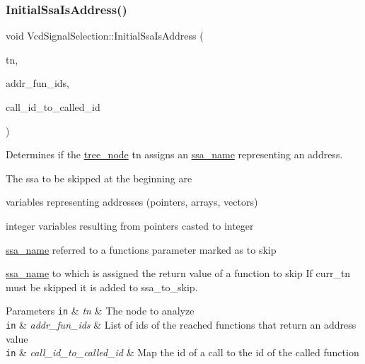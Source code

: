 \subsubsection{\texorpdfstring{Initial\+Ssa\+Is\+Address()}{InitialSsaIsAddress()}}
{\footnotesize\ttfamily void Vcd\+Signal\+Selection\+::\+Initial\+Ssa\+Is\+Address (\begin{DoxyParamCaption}\item[{const \hyperlink{tree__node_8hpp_a3cf5d02292c940f3892425a5b5fdec3c}{tree\+\_\+node\+Const\+Ref} \&}]{tn,  }\item[{const \hyperlink{classCustomUnorderedSet}{Custom\+Unordered\+Set}$<$ unsigned int $>$ \&}]{addr\+\_\+fun\+\_\+ids,  }\item[{const \hyperlink{custom__map_8hpp_ad1ed68f2ff093683ab1a33522b144adc}{Custom\+Unordered\+Map}$<$ unsigned int, \hyperlink{custom__set_8hpp_a1f63d303cef2790dc0a0ff7feae38f83}{Unordered\+Set\+Std\+Stable}$<$ unsigned int $>$$>$ \&}]{call\+\_\+id\+\_\+to\+\_\+called\+\_\+id }\end{DoxyParamCaption})\hspace{0.3cm}{\ttfamily [protected]}}



Determines if the \hyperlink{classtree__node}{tree\+\_\+node} tn assigns an \hyperlink{structssa__name}{ssa\+\_\+name} representing an address. 

The ssa to be skipped at the beginning are
\begin{DoxyItemize}
\item variables representing addresses (pointers, arrays, vectors)
\item integer variables resulting from pointers casted to integer
\item \hyperlink{structssa__name}{ssa\+\_\+name} referred to a function\textquotesingle{}s parameter marked as to skip
\item \hyperlink{structssa__name}{ssa\+\_\+name} to which is assigned the return value of a function to skip If curr\+\_\+tn must be skipped it is added to ssa\+\_\+to\+\_\+skip. 
\begin{DoxyParams}[1]{Parameters}
\mbox{\tt in}  & {\em tn} & The node to analyze \\
\hline
\mbox{\tt in}  & {\em addr\+\_\+fun\+\_\+ids} & List of ids of the reached functions that return an address value \\
\hline
\mbox{\tt in}  & {\em call\+\_\+id\+\_\+to\+\_\+called\+\_\+id} & Map the id of a call to the id of the called function \\
\hline
\end{DoxyParams}

\end{DoxyItemize}

